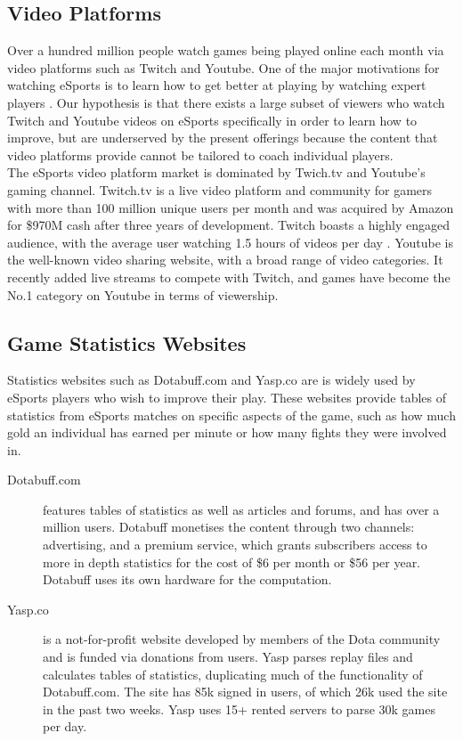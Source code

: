 \documentclass[12pt]{article} %
\begin{document}
\subsection{Video Platforms}
 
Over a hundred million people watch games being played online each month via video platforms such as Twitch and Youtube. One of the major motivations for watching eSports is to learn how to get better at playing by watching expert players \cite{Hamari15}. Our hypothesis is that there exists a large subset of viewers who watch Twitch and Youtube videos on eSports specifically in order to learn how to improve, but are underserved by the present offerings because the content that video platforms provide cannot be tailored to coach individual players.\\
 
The eSports video platform market is dominated by Twich.tv and Youtube's gaming channel. Twitch.tv is a live video platform and community for gamers with more than 100 million unique users per month and was acquired by Amazon for \$970M cash after three years of development. Twitch boasts a highly engaged audience, with the average user watching 1.5 hours of videos per day \cite{Dredge}. Youtube is the well-known video sharing website, with a broad range of video categories. It recently added live streams to compete with Twitch, and games have become the No.1 category on Youtube in terms of viewership.
 
\subsection{Game Statistics Websites}
 
Statistics websites such as Dotabuff.com and Yasp.co are is widely used by eSports players who wish to improve their play. These websites provide tables of statistics from eSports matches on specific aspects of the game, such as how much gold an individual has earned per minute or how many fights they were involved in.

\begin{description}
    \item [Dotabuff.com] features tables of statistics as well as articles and forums, and has over a million users. Dotabuff monetises the content through two channels: advertising, and a premium service, which grants subscribers access to more in depth statistics for the cost of \$6 per month or \$56 per year. Dotabuff uses its own hardware for the computation.
 
    \item [Yasp.co] is a not-for-profit website developed by members of the Dota community and is funded via donations from users. Yasp parses replay files and calculates tables of statistics, duplicating much of the functionality of Dotabuff.com. The site has 85k signed in users, of which 26k used the site in the past two weeks. Yasp uses 15+ rented servers to parse 30k games per day.
\end{description}
\end{document}
